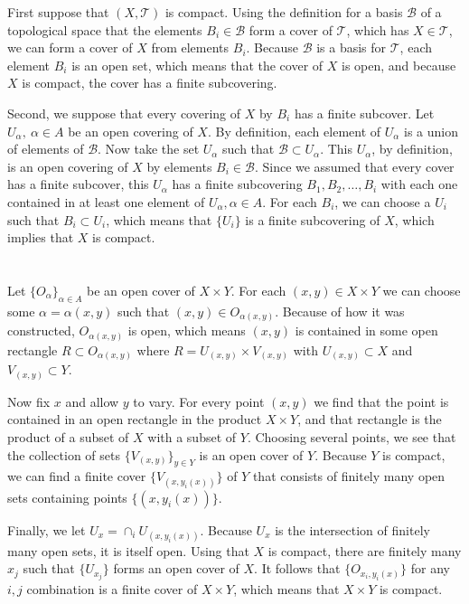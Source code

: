 \documentclass{jhwhw}
\newcommand{\T}{{\mathcal T}}
\newcommand{\B}{{\mathcal B}}
\begin{document}
First suppose that $(X,\T)$ is compact. Using the definition for a basis $\B$ of a topological space that the elements $B_i \in \B$ form a cover of $\T$, which has $X \in \T$, we can form a cover of $X$ from elements $B_i$. Because $\B$ is a basis for $\T$, each element $B_i$ is an open set, which means that the cover of $X$ is open, and because $X$ is compact, the cover has a finite subcovering.

Second, we suppose that every covering of $X$ by $B_i$ has a finite subcover. Let  $U_{\alpha}, \ \alpha \in A$ be an open covering of $X$.  By definition, each element of $U_{\alpha}$ is a union of elements of $\B$. Now take the set $U_{\alpha}$ such that $\B \subset U_{\alpha}$. This $U_{\alpha}$, by definition, is an open covering of $X$ by elements $B_i \in \B$.  Since we assumed that every cover has a finite subcover, this $U_{\alpha}$ has a finite subcovering $B_1,B_2, \dots, B_i$ with each one contained in at least one element of $U_{\alpha}, \alpha \in A$. For each $B_i$, we can choose a $U_i$ such that $B_i \subset U_i$, which means that $\{U_i\}$ is a finite subcovering of $X$, which implies that $X$ is compact.

\part{}%

Let $\{O_{\alpha}\}_{\alpha \in A}$ be an open cover of $X \times Y$. For each $(x,y) \in X\times Y$ we can choose some $\alpha=\alpha(x,y)$ such that $(x,y) \in O_{\alpha(x,y)}$. Because of how it was constructed, $O_{\alpha(x,y)}$ is open, which means $(x,y)$ is contained in some open rectangle $R \subset O_{\alpha(x,y)}$ where $R = U_{(x,y)} \times V_{(x,y)}$ with $U_{(x,y)} \subset X$ and $V_{(x,y)} \subset Y$.  


Now fix $x$ and allow $y$ to vary. For every point $(x,y)$ we find that the point is contained in an open rectangle in the product $X \times Y$, and that rectangle is the product of a subset of $X$ with a subset of $Y$. Choosing several points, we see that the collection of sets $\{V_{(x,y)}\}_{y \in Y}$ is an open cover of $Y$. Because $Y$ is compact, we can find a finite cover $\{V_{(x,y_i(x))}\}$ of $Y$ that consists of finitely many open sets containing points $\{(x,y_i(x))\}$.


Finally, we let $U_x = \cap_{i} U_{(x,y_i(x))}$. Because $U_x$ is the intersection of finitely many open sets, it is itself open. Using that $X$ is compact, there are finitely many $x_j$ such that $\{U_{x_j}\}$ forms an open cover of $X$. It follows that $\{O_{x_i,y_i(x)}\}$ for any $i,j$ combination is a finite cover of $X \times Y$, which means that $X \times Y$ is compact.
\end{document}
